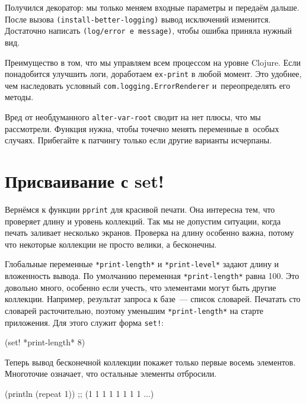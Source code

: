 Получился декоратор: мы только меняем входные параметры и передаём дальше. После
вызова \verb|(install-better-logging)| вывод исключений изменится. Достаточно
написать \texttt{(log/error e message)}, чтобы ошибка приняла нужный вид.

Преимущество в том, что мы управляем всем процессом на уровне Clojure. Если
понадобится улучшить логи, доработаем \verb|ex-print| в любой момент. Это
удобнее, чем наследовать условный \verb|com.logging.ErrorRenderer|
и~переопределять его методы.

Вред от необдуманного \verb|alter-var-root| сводит на нет плюсы, что мы
рассмотрели. Функция нужна, чтобы точечно менять переменные в~особых
случаях. Прибегайте к патчингу только если другие варианты исчерпаны.

\section{Присваивание с set!}


Вернёмся к функции \verb|pprint| для красивой печати. Она интересна тем, что
проверяет длину и уровень коллекций. Так мы не допустим ситуации, когда печать
заливает несколько экранов. Проверка на длину особенно важна, потому что
некоторые коллекции не просто велики, а бесконечны.


Глобальные переменные \verb|*print-length*| и \verb|*print-level*| задают длину
и вложенность вывода. По умолчанию переменная \verb|*print-length*| равна 100. Это довольно
много, особенно если учесть, что элементами могут быть другие
коллекции. Например, результат запроса к базе~--- список словарей. Печатать сто
словарей расточительно, поэтому уменьшим \verb|*print-length*| на старте
приложения. Для этого служит форма \verb|set!|:

\begin{english}
  \begin{clojure}
(set! *print-length* 8)
  \end{clojure}
\end{english}

Теперь вывод бесконечной коллекции покажет только первые восемь
элементов. Многоточие означает, что остальные элементы отбросили.

\begin{english}
  \begin{clojure}
(println (repeat 1))
;; (1 1 1 1 1 1 1 1 ...)
  \end{clojure}
\end{english}

